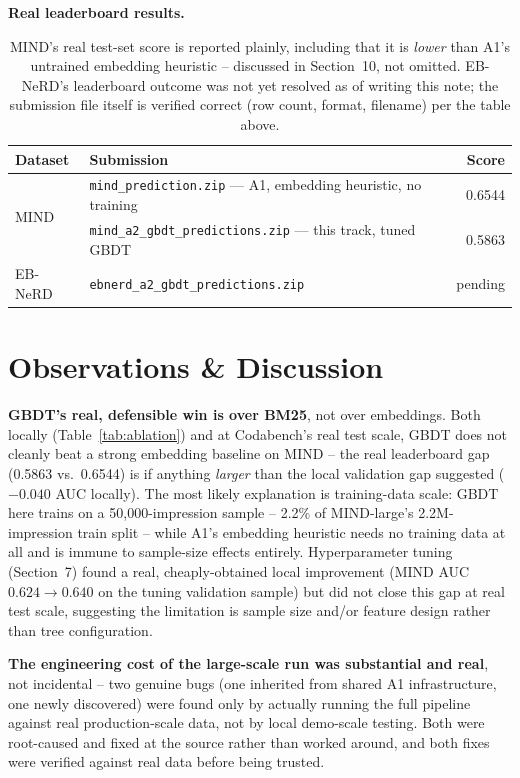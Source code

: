 \documentclass[11pt,a4paper]{article}
\begin{document}
\textbf{Real leaderboard results.}

\begin{table}[h]
\centering\small
\begin{tabularx}{\textwidth}{l X r}
\toprule
\textbf{Dataset} & \textbf{Submission} & \textbf{Score} \\
\midrule
\multirow{2}{*}{MIND}
 & \texttt{mind\_prediction.zip} --- A1, embedding heuristic, no training & 0.6544 \\
 & \texttt{mind\_a2\_gbdt\_predictions.zip} --- this track, tuned GBDT & 0.5863 \\
\midrule
EB-NeRD & \texttt{ebnerd\_a2\_gbdt\_predictions.zip} & pending \\
\bottomrule
\end{tabularx}
\caption{MIND's real test-set score is reported plainly, including that it is
\emph{lower} than A1's untrained embedding heuristic -- discussed in Section~10, not
omitted. EB-NeRD's leaderboard outcome was not yet resolved as of writing this note;
the submission file itself is verified correct (row count, format, filename) per the
table above.}
\end{table}

\section*{Observations \& Discussion}

\textbf{GBDT's real, defensible win is over BM25}, not over embeddings. Both locally
(Table~\ref{tab:ablation}) and at Codabench's real test scale, GBDT does not cleanly
beat a strong embedding baseline on MIND -- the real leaderboard gap (0.5863 vs.\
0.6544) is if anything \emph{larger} than the local validation gap suggested
($-0.040$ AUC locally). The most likely explanation is training-data scale: GBDT here
trains on a 50{,}000-impression sample -- 2.2\% of MIND-large's 2.2M-impression train
split -- while A1's embedding heuristic needs no training data at all and is immune to
sample-size effects entirely. Hyperparameter tuning (Section~7) found a real,
cheaply-obtained local improvement (MIND AUC $0.624\to0.640$ on the tuning validation
sample) but did not close this gap at real test scale, suggesting the limitation is
sample size and/or feature design rather than tree configuration.

\textbf{The engineering cost of the large-scale run was substantial and real}, not
incidental -- two genuine bugs (one inherited from shared A1 infrastructure, one newly
discovered) were found only by actually running the full pipeline against real
production-scale data, not by local demo-scale testing. Both were root-caused and fixed
at the source rather than worked around, and both fixes were verified against real data
before being trusted.
\end{document}
